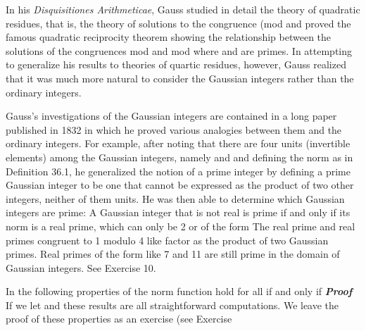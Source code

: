 \documentclass[11pt,oneside]{article}
\begin{document}
\begin{BookBody}
\noindent In his\textit{ Disquisitiones Arithmeticae}, Gauss studied in detail the theory of quadratic residues, that is, the theory of solutions to the congruence  (mod  and proved the famous quadratic reciprocity theorem showing the relationship between the solutions of the congruences mod  and mod  where  and  are primes. In attempting to generalize his results to theories of quartic residues, however, Gauss realized that it was much more natural to consider the Gaussian integers rather than the ordinary integers.

\noindent Gauss’s investigations of the Gaussian integers are contained in a long paper published in 1832 in which he proved various analogies between them and the ordinary integers. For example, after noting that there are four units (invertible elements) among the Gaussian integers, namely  and  and defining the norm as in Definition 36.1, he generalized the notion of a prime integer by defining a prime Gaussian integer to be one that cannot be expressed as the product of two other integers, neither of them units. He was then able to determine which Gaussian integers are prime: A Gaussian integer that is not real is prime if and only if its norm is a real prime, which can only be 2 or of the form  The real prime  and real primes congruent to 1 modulo 4 like  factor as the product of two Gaussian primes. Real primes of the form  like 7 and 11 are still prime in the domain of Gaussian integers. See Exercise 10.

  In  the following properties of the norm function  hold for all    if and only if   \textit{\textbf{Proof}} If we let  and  these results are all straightforward computations. We leave the proof of these properties as an exercise (see Exercise \BookEnd{\blacklozenge}

\end{BookBody}
\end{document}

